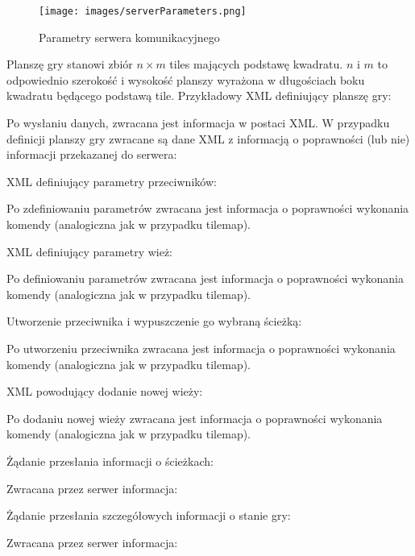 \begin{figure}
\texttt{[image: images/serverParameters.png]}
\caption{Parametry serwera komunikacyjnego}
\label{Fig:serverParameters}
\end{figure} 

Planszę gry stanowi zbiór $n \times m$ tiles mających podstawę kwadratu. $n$ i $m$ to odpowiednio szerokość i wysokość planszy wyrażona w długościach boku kwadratu będącego podstawą tile. Przykładowy XML  definiujący planszę gry:


Po wysłaniu danych, zwracana jest informacja w postaci XML. W przypadku definicji planszy gry zwracane są dane XML z informacją o poprawności (lub nie) informacji przekazanej do serwera:


XML definiujący parametry przeciwników:


Po zdefiniowaniu parametrów zwracana jest informacja o poprawności wykonania komendy (analogiczna jak w przypadku tilemap). 

XML definiujący parametry wież:


Po definiowaniu parametrów zwracana jest informacja o poprawności wykonania komendy (analogiczna jak w przypadku tilemap). 

Utworzenie przeciwnika i wypuszczenie go wybraną ścieżką:


Po utworzeniu przeciwnika zwracana jest informacja o poprawności wykonania komendy (analogiczna jak w przypadku tilemap). 

XML powodujący dodanie nowej wieży:


Po dodaniu nowej wieży zwracana jest informacja o poprawności wykonania komendy (analogiczna jak w przypadku tilemap). 

Żądanie przesłania informacji o ścieżkach:


Zwracana przez serwer informacja:


Żądanie przesłania szczegółowych informacji o stanie gry:


Zwracana przez serwer informacja:

